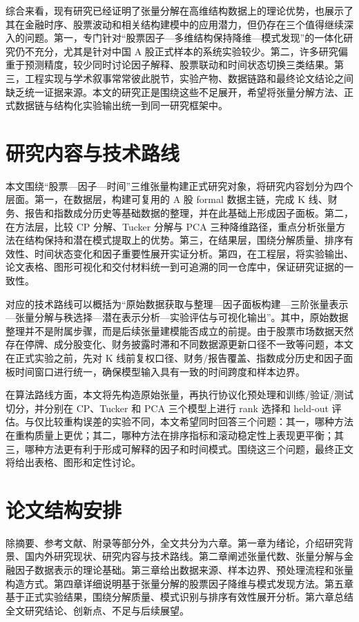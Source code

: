 综合来看，现有研究已经证明了张量分解在高维结构数据上的理论优势，也展示了其在金融时序、股票波动和相关结构建模中的应用潜力，但仍存在三个值得继续深入的问题。第一，专门针对“股票因子—多维结构保持降维—模式发现”的一体化研究仍不充分，尤其是针对中国 A 股正式样本的系统实验较少。第二，许多研究偏重于预测精度，较少同时讨论因子解释、股票联动和时间状态切换三类结果。第三，工程实现与学术叙事常常彼此脱节，实验产物、数据链路和最终论文结论之间缺乏统一证据来源。本文的研究正是围绕这些不足展开，希望将张量分解方法、正式数据链与结构化实验输出统一到同一研究框架中。

\section{研究内容与技术路线}

本文围绕“股票—因子—时间”三维张量构建正式研究对象，将研究内容划分为四个层面。第一，在数据层，构建可复用的 A 股 formal 数据主链，完成 K 线、财务、报告和指数成分历史等基础数据的整理，并在此基础上形成因子面板。第二，在方法层，比较 CP 分解、Tucker 分解与 PCA 三种降维路径，重点分析张量方法在结构保持和潜在模式提取上的优势。第三，在结果层，围绕分解质量、排序有效性、时间状态变化和因子重要性展开实证分析。第四，在工程层，将实验输出、论文表格、图形可视化和交付材料统一到可追溯的同一仓库中，保证研究证据的一致性。

对应的技术路线可以概括为“原始数据获取与整理—因子面板构建—三阶张量表示—张量分解与秩选择—潜在表示分析—实验评估与可视化输出”。其中，原始数据整理并不是附属步骤，而是后续张量建模能否成立的前提。由于股票市场数据天然存在停牌、成分股变化、财务披露时滞和不同数据源更新口径不一致等问题，本文在正式实验之前，先对 K 线前复权口径、财务/报告覆盖、指数成分历史和因子面板时间窗口进行统一，确保模型输入具有一致的时间跨度和样本边界。

在算法路线方面，本文将先构造原始张量，再执行协议化预处理和训练/验证/测试切分，并分别在 CP、Tucker 和 PCA 三个模型上进行 rank 选择和 held-out 评估。与仅比较重构误差的实验不同，本文希望同时回答三个问题：其一，哪种方法在重构质量上更优；其二，哪种方法在排序指标和滚动稳定性上表现更平衡；其三，哪种方法更有利于形成可解释的因子和时间模式。围绕这三个问题，最终正文将给出表格、图形和定性讨论。

\section{论文结构安排}

除摘要、参考文献、附录等部分外，全文共分为六章。第一章为绪论，介绍研究背景、国内外研究现状、研究内容与技术路线。第二章阐述张量代数、张量分解与金融因子数据表示的理论基础。第三章给出数据来源、样本边界、预处理流程和张量构造方式。第四章详细说明基于张量分解的股票因子降维与模式发现方法。第五章基于正式实验结果，围绕分解质量、模式识别与排序有效性展开分析。第六章总结全文研究结论、创新点、不足与后续展望。

